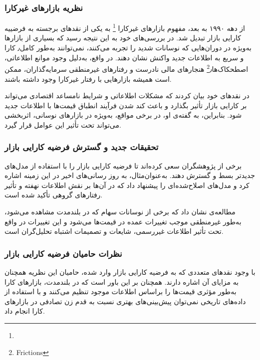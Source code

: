\subsubsection{نظریه بازارهای غیرکارا}

از دهه ۱۹۹۰ به بعد، مفهوم بازارهای غیرکارا \footnote{} به یکی از نقدهای برجسته به فرضییه کارایی بازار تبدیل شد. \cite{malkiel2003efficient} در بررسی‌های خود به این نتیجه رسید که بسیاری از بازارها به‌ویژه در دوران‌هایی که نوسانات شدید را تجربه می‌کنند، نمی‌توانند به‌طور کامل٫ کارا و سریع به اطلاعات جدید واکنش نشان دهند. در واقع، به‌دلیل وجود موانع اطلاعاتی، اصطحکاک‌ها\footnote{Frictions}٫ هنجارهای مالی نادرست و رفتارهای غیرمنطقی سرمایه‌گذاران، ممکن است همیشه بازارهایی با رفتار غیرکارا وجود داشته باشند.

\cite{fama1991efficient} در نقدهای خود بیان کردند که مشکلات اطلاعاتی و شرایط نامساعد اقتصادی می‌تواند بر کارایی بازار تأثیر بگذارد و باعث کند شدن فرآیند انطباق قیمت‌ها با اطلاعات جدید شود. بنابراین، به گفته‌ی او، در برخی مواقع، به‌ویژه در بازارهای نوسانی، اثربخشی  می‌تواند تحت تأثیر این عوامل قرار گیرد.

\subsubsection{تحقیقات جدید و گسترش فرضیه کارایی بازار}
برخی از پژوهشگران سعی کرده‌اند تا فرضیه کارایی بازار را با استفاده از مدل‌های جدیدتر بسط و گسترش دهند. به‌عنوان‌مثال، \cite{fama2014five} به روز رسانی‌های اخیر در این زمینه اشاره کرد و مدل‌های اصلاح‌شده‌ای را پیشنهاد داد که در آن‌ها بر نقش اطلاعات نهفته و تأثیر رفتارهای گروهی تأکید شده است.

مطالعه‌ی \cite{poterba1992stock} نشان داد که برخی از نوسانات سهام که در بلندمدت مشاهده می‌شود، به‌طور غیرمنطقی موجب تغییرات عمده در قیمت‌ها می‌شود و این تغییرات در واقع تحت تأثیر اطلاعات غیررسمی، شایعات و تصمیمات اشتباه تحلیل‌گران است.

\subsubsection{نظرات حامیان فرضیه کارایی بازار}

با وجود نقدهای متعددی که به فرضیه کارایی بازار وارد شده، حامیان این نظریه همچنان به مزایای آن اشاره دارند. \cite{malkiel2003efficient} همچنان بر این باور است که در بلندمدت، بازارهای کارا به‌طور مؤثری قیمت‌ها را براساس اطلاعات موجود تنظیم می‌کنند و با استفاده از داده‌های تاریخی نمی‌توان پیش‌بینی‌های بهتری نسبت به قدم زن تصادفی در بازارهای کارا انجام داد.

